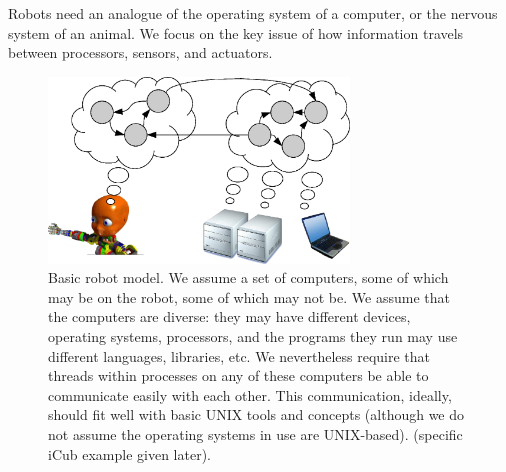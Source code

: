 


Robots need an analogue of the operating system of a computer, or the
nervous system of an animal.  We focus on the key issue of how information
travels between processors, sensors, and actuators.



\begin{figure}
\centerline{
\includegraphics[width=8cm]{fig-nethead}
}
\caption{
%
Basic robot model.  We assume a set of computers, some of which may be
on the robot, some of which may not be.  We assume that the computers
are diverse: they may have different devices, operating systems,
processors, and the programs they run may use different languages,
libraries, etc.  We nevertheless require that threads within processes
on any of these computers be able to communicate easily with each other.
This communication, ideally, should fit well with basic UNIX 
tools and concepts (although we do not assume the operating systems
in use are UNIX-based).
%
%
%
(specific iCub example given later).
%
}
\end{figure}






